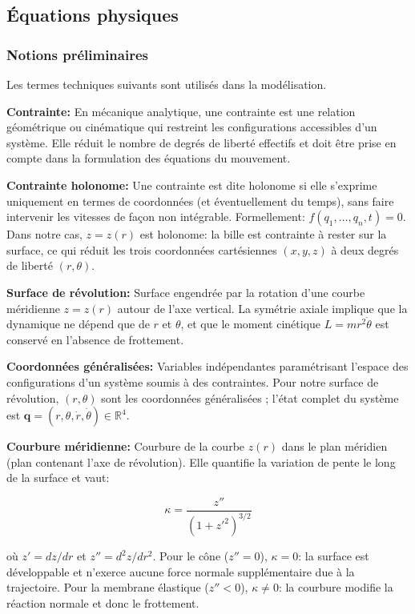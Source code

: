 \documentclass[
	a4paper, %
	10pt, %
	unnumberedsections, %
	twoside, %
]{LTJournalArticle}
\begin{document}
\subsection{Équations physiques}
\label{app:phys}

\subsubsection{Notions préliminaires}

Les termes techniques suivants sont utilisés dans la modélisation.

\textbf{Contrainte:} En mécanique analytique, une contrainte est une relation
géométrique ou cinématique qui restreint les configurations accessibles d'un
système. Elle réduit le nombre de degrés de liberté effectifs et doit être
prise en compte dans la formulation des équations du mouvement.

\textbf{Contrainte holonome:} Une contrainte est dite holonome si elle
s'exprime uniquement en termes de coordonnées (et éventuellement du temps),
sans faire intervenir les vitesses de façon non intégrable. Formellement:
$f(q_1, \ldots, q_n, t) = 0$. Dans notre cas, $z = z(r)$ est holonome: la
bille est contrainte à rester sur la surface, ce qui réduit les trois
coordonnées cartésiennes $(x, y, z)$ à deux degrés de liberté $(r, \theta)$.

\textbf{Surface de révolution:} Surface engendrée par la rotation d'une
courbe méridienne $z = z(r)$ autour de l'axe vertical. La symétrie axiale
implique que la dynamique ne dépend que de $r$ et $\theta$, et que le
moment cinétique $L = mr^2\dot{\theta}$ est conservé en l'absence de frottement.

\textbf{Coordonnées généralisées:} Variables indépendantes paramétrisant
l'espace des configurations d'un système soumis à des contraintes. Pour
notre surface de révolution, $(r, \theta)$ sont les coordonnées généralisées ;
l'état complet du système est $\mathbf{q} = (r, \theta, \dot{r}, \dot{\theta})
\in \mathbb{R}^4$.

\textbf{Courbure méridienne:} Courbure de la courbe $z(r)$ dans le plan
méridien (plan contenant l'axe de révolution). Elle quantifie la variation
de pente le long de la surface et vaut:

\begin{equation}
    \kappa = \frac{z''}{(1+z'^2)^{3/2}}
\end{equation}

où $z' = dz/dr$ et $z'' = d^2z/dr^2$. Pour le cône ($z''=0$), $\kappa=0$:
la surface est développable et n'exerce aucune force normale supplémentaire
due à la trajectoire. Pour la membrane élastique ($z'' < 0$), $\kappa \neq 0$: la
courbure modifie la réaction normale et donc le frottement.
\end{document}
